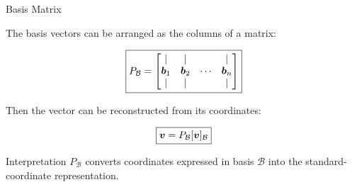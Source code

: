 
\begin{frame}{Basis Matrix}

The basis vectors can be arranged as the columns of a matrix:

\[
\boxed{
P_{\mathcal{B}}
=
\begin{bmatrix}
|&|&&|\\
\bm{b}_1&\bm{b}_2&\cdots&\bm{b}_n\\
|&|&&|
\end{bmatrix}
}
\]

\vspace{0.3cm}

Then the vector can be reconstructed from its coordinates:

\[
\boxed{
\bm{v}
=
P_{\mathcal{B}}[\bm{v}]_{\mathcal{B}}
}
\]

\vspace{0.3cm}

\begin{block}{Interpretation}
$P_{\mathcal{B}}$ converts coordinates expressed in basis
$\mathcal{B}$ into the standard-coordinate representation.
\end{block}

\end{frame}



